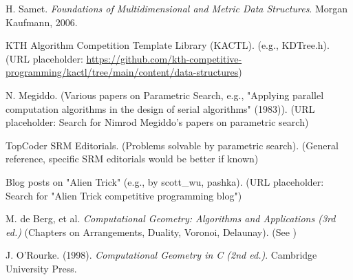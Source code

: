 \begin{thebibliography}{99}
H. Samet.
\textit{Foundations of Multidimensional and Metric Data Structures}.
Morgan Kaufmann, 2006.
\label{ref:samet_spatial_ds}

KTH Algorithm Competition Template Library (KACTL). (e.g., KDTree.h).
(URL placeholder: \url{https://github.com/kth-competitive-programming/kactl/tree/main/content/data-structures})
\label{ref:kactl_spatial_ds}

N. Megiddo. (Various papers on Parametric Search, e.g., "Applying parallel computation algorithms in the design of serial algorithms" (1983)).
(URL placeholder: Search for Nimrod Megiddo's papers on parametric search)
\label{ref:megiddo_parametric_search}

TopCoder SRM Editorials. (Problems solvable by parametric search).
(General reference, specific SRM editorials would be better if known)
\label{ref:topcoder_srm_parametric_search}

Blog posts on "Alien Trick" (e.g., by scott\_wu, pashka).
(URL placeholder: Search for "Alien Trick competitive programming blog")
\label{ref:alien_trick_blogs}

M. de Berg, et al. \textit{Computational Geometry: Algorithms and Applications (3rd ed.)} (Chapters on Arrangements, Duality, Voronoi, Delaunay).
(See )
\label{ref:deberg_arrangements_voronoi}

J. O'Rourke. (1998). \textit{Computational Geometry in C (2nd ed.)}.
Cambridge University Press.
\label{ref:orourke_comp_geom_c}


\end{thebibliography}